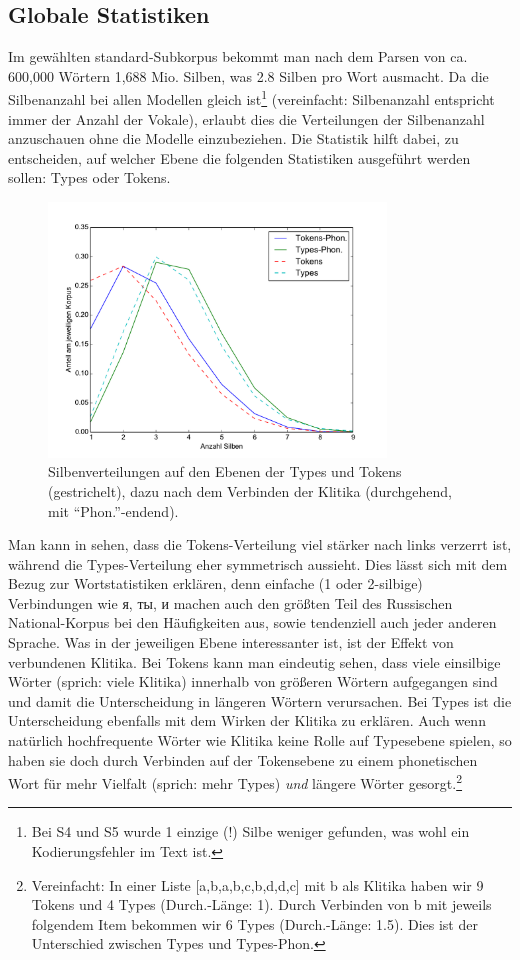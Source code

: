 \documentclass[12pt,headsepline,a4paper]{scrartcl}
\newcommand\textcyr[1]{{\fontencoding{OT2}\fontfamily{wncyr}\selectfont #1}}
\begin{document}
\subsection{Globale Statistiken}
Im gewählten standard-Subkorpus bekommt man nach dem Parsen von ca. 600,000 Wörtern 1,688 Mio. Silben, was 2.8 Silben pro Wort ausmacht. Da die Silbenanzahl bei allen Modellen gleich ist\footnote{Bei S4 und S5 wurde 1 einzige (!) Silbe weniger gefunden, was wohl ein Kodierungsfehler im Text ist.} (vereinfacht: Silbenanzahl entspricht immer der Anzahl der Vokale), erlaubt dies die Verteilungen der Silbenanzahl anzuschauen ohne die Modelle einzubeziehen. Die Statistik hilft dabei, zu entscheiden, auf welcher Ebene die folgenden Statistiken ausgeführt werden sollen: Types oder Tokens.
 
\begin{figure}[htbp]
\centering
\includegraphics[width=0.8\textwidth]{figures/syls_stats_glob.pdf}
\caption{Silbenverteilungen auf den Ebenen der Types und Tokens (gestrichelt), dazu nach dem Verbinden der Klitika (durchgehend, mit "`Phon."'-endend).}
\label{fig: syl_glob}
\end{figure}

Man kann in  sehen, dass die Tokens-Verteilung viel stärker nach links verzerrt ist, während die Types-Verteilung eher symmetrisch aussieht. Dies lässt sich mit dem Bezug zur Wortstatistiken erklären, denn einfache (1 oder 2-silbige) Verbindungen wie \textcyr{я, ты, и} machen auch den größten Teil des Russischen National-Korpus bei den Häufigkeiten aus, sowie tendenziell auch jeder anderen Sprache. Was in der jeweiligen Ebene interessanter ist, ist der Effekt von verbundenen Klitika. Bei Tokens kann man eindeutig sehen, dass viele einsilbige Wörter (sprich: viele Klitika) innerhalb von größeren Wörtern aufgegangen sind und damit die Unterscheidung in längeren Wörtern verursachen. Bei Types ist die Unterscheidung ebenfalls mit dem Wirken der Klitika zu erklären. Auch wenn natürlich hochfrequente Wörter wie Klitika keine Rolle auf Typesebene spielen, so haben sie doch durch Verbinden auf der Tokensebene zu einem phonetischen Wort für mehr Vielfalt (sprich: mehr Types) \textit{und} längere Wörter gesorgt.\footnote{Vereinfacht: In einer Liste [a,b,a,b,c,b,d,d,c] mit b als Klitika haben wir 9 Tokens und 4 Types (Durch.-Länge: 1). Durch Verbinden von b mit jeweils folgendem Item bekommen wir 6 Types (Durch.-Länge: 1.5). Dies ist der Unterschied zwischen Types und Types-Phon.}
\end{document}
